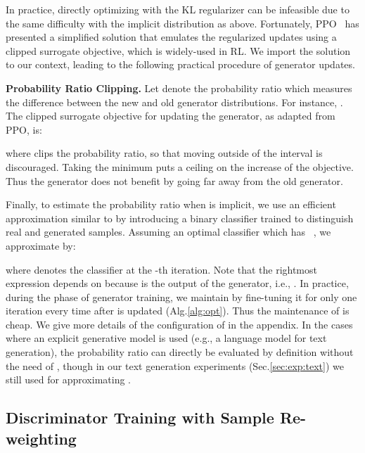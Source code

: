 \documentclass{article}
\newcommand{\0}{\bm{0}}
\begin{document}
In practice, directly optimizing with the KL regularizer can be infeasible due to the same difficulty with the implicit distribution as above. Fortunately, PPO~\cite{PPO} has presented a simplified solution that emulates the regularized updates using a clipped surrogate objective, which is widely-used in RL. We import the solution to our context, leading to the following practical procedure of generator updates.

\textbf{Probability Ratio Clipping.}  
Let  denote the probability ratio  which measures the difference between the new and old generator distributions.
For instance, . 
The clipped surrogate objective for updating the generator, as adapted from PPO, is:

where  clips the probability ratio, so that moving  outside of the interval  is discouraged. Taking the minimum puts a ceiling on the increase of the objective. Thus the generator does not benefit by going far away from the old generator.

Finally, to estimate the probability ratio  when  is implicit, we use an efficient approximation similar to \cite{MLGAN,grover2019bias} by introducing a binary classifier  trained to distinguish real and generated samples. Assuming an optimal classifier  which has ~\cite{goodfellow2014generative,MLGAN}, we approximate  by: 

where  denotes the classifier at the -th iteration. 
Note that the rightmost expression depends on  because  is the output of the generator, i.e., .
In practice, during the phase of generator training, we maintain  by fine-tuning it for only one iteration every time after  is updated (Alg.\ref{alg:opt}). Thus the maintenance of  is cheap. We give more details of the configuration of  in the appendix. In the cases where an explicit generative model is used (e.g., a language model for text generation), the probability ratio  can directly be evaluated by definition without the need of , though in our text generation experiments (Sec.\ref{sec:exp:text}) we still used  for approximating .




\subsection{Discriminator Training with Sample Re-weighting}\label{sec:method:dis}
\end{document}
